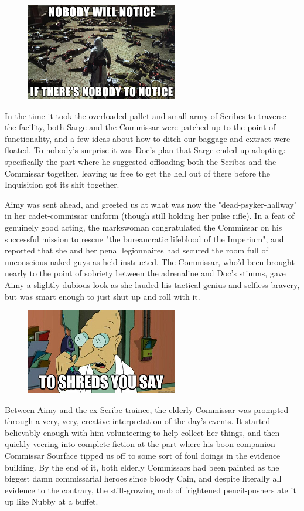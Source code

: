 \begin{figure}
	\begin{center}
		\includegraphics[width=\figwidth]{pics/21/111.png}
	\end{center}
\end{figure}
In the time it took the overloaded pallet and small army of Scribes to traverse the facility, both Sarge and the Commissar were patched up to the point of functionality, and a few ideas about how to ditch our baggage and extract were floated. 
To nobody's surprise it was Doc's plan that Sarge ended up adopting: 
specifically the part where he suggested  offloading both the Scribes and the Commissar together, leaving us free to get the hell out of there before the Inquisition got its shit together.

Aimy was sent ahead, and greeted us at what was now the "dead-psyker-hallway" in her cadet-commissar uniform (though still holding her pulse rifle). 
In a feat of genuinely good acting, the markswoman congratulated the Commissar on his successful mission to rescue "the bureaucratic lifeblood of the Imperium", and reported that she and her penal legionnaires had secured the room full of unconscious naked guys as he'd instructed. 
The Commissar, who'd been brought nearly to the point of sobriety between the adrenaline and Doc's stimms, gave Aimy a slightly dubious look as she lauded his tactical genius and selfless bravery, but was smart enough to just shut up and roll with it.

\begin{figure}
	\begin{center}
		\includegraphics[width=\figwidth]{pics/21/112.png}
	\end{center}
\end{figure}
Between Aimy and the ex-Scribe trainee, the elderly Commissar was prompted through a very, very, creative interpretation of the day's events. 
It started believably enough with him volunteering to help collect her things, and then quickly veering into complete fiction at the part where his boon companion Commissar Sourface tipped us off to some sort of foul doings in the evidence building. 
By the end of it, both elderly Commissars had been painted as the biggest damn commissarial heroes since bloody Cain, and despite literally all evidence to the contrary, the still-growing mob of frightened pencil-pushers ate it up like Nubby at a buffet.

